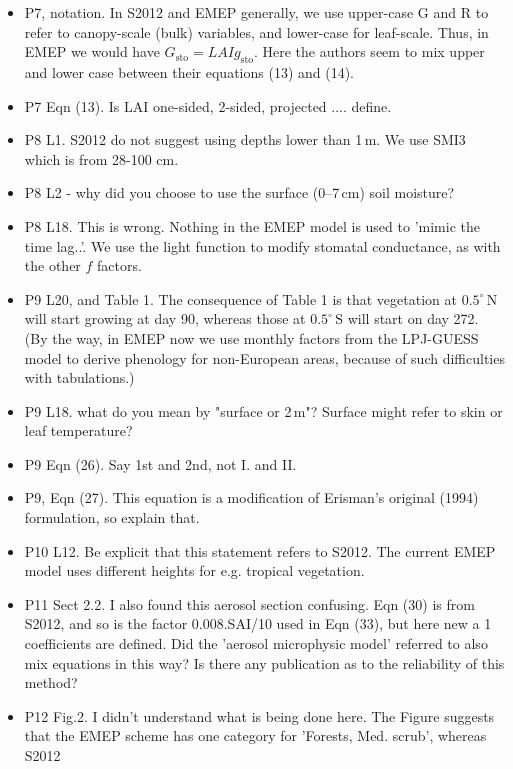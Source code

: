 \documentclass{scrartcl}
\begin{document}
\begin{itemize}
{have more or less been used until today.}
\item {\color{blue}P7, notation. In S2012 and EMEP generally, we use upper-case G and R to refer
to canopy-scale (bulk) variables, and lower-case for leaf-scale. Thus, in EMEP
we would have $G_\mathrm{sto} = LAI g_\mathrm{sto}$. Here the authors seem to mix upper and lower
case between their equations (13) and (14).}
\item {\color{blue}P7 Eqn (13). Is LAI one-sided, 2-sided, projected .... define.}
\item {\color{blue}P8 L1. S2012 do not suggest using depths lower than 1\,m. We use SMI3 which
is from 28-100 cm.}
\item {\color{blue}P8 L2 - why did you choose to use the surface (0--7\,cm) soil moisture?}
\item {\color{blue}P8 L18. This is wrong. Nothing in the EMEP model is used to ’mimic the
time lag..’. We use the light function to modify stomatal conductance, as with the
other $f$ factors.}
\item {\color{blue}P9 L20, and Table 1. The consequence of Table 1 is that vegetation at $0.5^\circ\,\mathrm{N}$
will start growing at day 90, whereas those at $0.5^\circ\,\mathrm{S}$ will start on day 272. (By the
way, in EMEP now we use monthly factors from the LPJ-GUESS model to derive
phenology for non-European areas, because of such difficulties with tabulations.)}
\item {\color{blue}P9 L18. what do you mean by "surface or 2\,m"? Surface might refer to skin or
leaf temperature?}
\item {\color{blue}P9 Eqn (26). Say 1st and 2nd, not I. and II.}
\item {\color{blue}P9, Eqn (27). This equation is a modification of Erisman’s original (1994) formulation, so explain that.}
\item {\color{blue}P10 L12. Be explicit that this statement refers to S2012. The current EMEP
model uses different heights for e.g. tropical vegetation.}
\item {\color{blue}P11 Sect 2.2. I also found this aerosol section confusing. Eqn (30) is from S2012,
and so is the factor 0.008.SAI/10 used in Eqn (33), but here new a 1 coefficients
are defined. Did the ’aerosol microphysic model’ referred to also mix equations
in this way? Is there any publication as to the reliability of this method?}
\item {\color{blue}P12 Fig.2. I didn’t understand what is being done here. The Figure suggests that
the EMEP scheme has one category for ’Forests, Med. scrub’, whereas S2012
}
\end{itemize}
\end{document}
